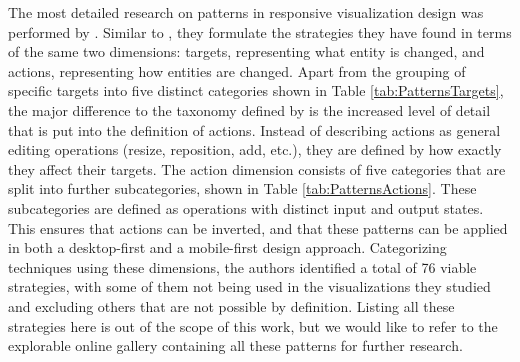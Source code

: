 The most detailed research on patterns in responsive visualization design was performed by \cite{DesignPatternsTradeOffsRespVis}. Similar to \cite{TechniquesForFlexibleRespVisDesign}, they formulate the strategies they have found in terms of the same two dimensions: targets, representing what entity is changed, and actions, representing how entities are changed. Apart from the grouping of specific targets into five distinct categories shown in Table \ref{tab:PatternsTargets}, the major difference to the taxonomy defined by \cite{TechniquesForFlexibleRespVisDesign} is the increased level of detail that is put into the definition of actions. Instead of describing actions as general editing operations (resize, reposition, add, etc.), they are defined by how exactly they affect their targets. The action dimension consists of five categories that are split into further subcategories, shown in Table \ref{tab:PatternsActions}. These subcategories are defined as operations with distinct input and output states. This ensures that actions can be inverted, and that these patterns can be applied in both a desktop-first and a mobile-first design approach. Categorizing techniques using these dimensions, the authors identified a total of 76 viable strategies, with some of them not being used in the visualizations they studied and excluding others that are not possible by definition. Listing all these strategies here is out of the scope of this work, but we would like to refer to the explorable online gallery \parencite{DesignPatternsTradeOffsRespVisGallery} containing all these patterns for further research.

